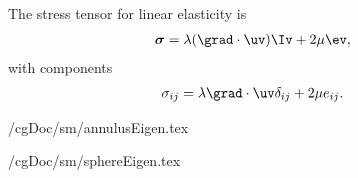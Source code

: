 % 
The stress tensor for linear elasticity is
\begin{align*}
   \sigmav &= \lambda (\grad\cdot\uv) \Iv + 2\mu \ev, 
\end{align*}
with components
\begin{align*}
   \sigma_{ij} &= \lambda \grad\cdot\uv \delta_{ij} + 2\mu e_{ij}. 
\end{align*}


%
 \homeHenshaw/cgDoc/sm/annulusEigen.tex


 \homeHenshaw/cgDoc/sm/sphereEigen.tex
